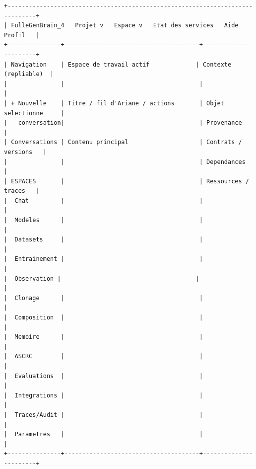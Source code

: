 \documentclass[11pt,a4paper]{article}
\begin{document}
\begin{lstlisting}
+------------------------------------------------------------------------------+
| FulleGenBrain_4   Projet v   Espace v   Etat des services   Aide   Profil   |
+---------------+--------------------------------------+-----------------------+
| Navigation    | Espace de travail actif             | Contexte (repliable)  |
|               |                                      |                       |
| + Nouvelle    | Titre / fil d'Ariane / actions       | Objet selectionne     |
|   conversation|                                      | Provenance            |
| Conversations | Contenu principal                    | Contrats / versions   |
|               |                                      | Dependances           |
| ESPACES       |                                      | Ressources / traces   |
|  Chat         |                                      |                       |
|  Modeles      |                                      |                       |
|  Datasets     |                                      |                       |
|  Entrainement |                                      |                       |
|  Observation |                                      |                       |
|  Clonage      |                                      |                       |
|  Composition  |                                      |                       |
|  Memoire      |                                      |                       |
|  ASCRC        |                                      |                       |
|  Evaluations  |                                      |                       |
|  Integrations |                                      |                       |
|  Traces/Audit |                                      |                       |
|  Parametres   |                                      |                       |
+---------------+--------------------------------------+-----------------------+
\end{lstlisting}
\end{document}
